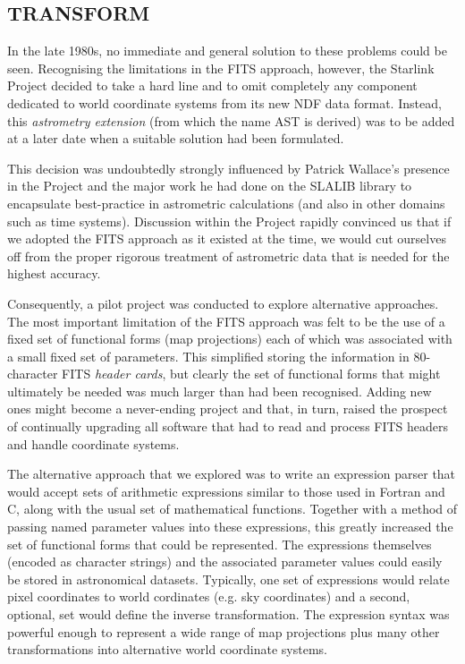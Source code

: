 \documentclass[final,authoryear,5p,times,twocolumn]{elsarticle}
\begin{document}
\subsection{TRANSFORM}

In the late 1980s, no immediate and general solution to these problems
could be seen. Recognising the limitations in the FITS approach,
however, the Starlink Project decided to take a hard line and to omit
completely any component dedicated to world coordinate systems from
its new NDF data format. Instead, this \emph{astrometry extension}
(from which the name AST is derived) was to be added at a later date
when a suitable solution had been formulated.

This decision was undoubtedly strongly influenced by Patrick Wallace's
presence in the Project and the major work he had done on the SLALIB
library \citep[][]{1994ASPC...61..481W} to encapsulate best-practice in
astrometric calculations (and also in other domains such as time
systems). Discussion within the Project rapidly convinced us that if
we adopted the FITS approach as it existed at the time, we would cut
ourselves off from the proper rigorous treatment of astrometric data
that is needed for the highest accuracy.

Consequently, a pilot project was conducted to explore alternative
approaches. The most important limitation of the FITS approach was felt
to be the use of a fixed set of functional forms (map projections) each
of which was associated with a small fixed set of parameters. This
simplified storing the information in 80-character FITS \emph{header cards},
but clearly the set of functional forms that might ultimately be needed
was much larger than had been recognised. Adding new ones might become a
never-ending project and that, in turn, raised the prospect of
continually upgrading all software that had to read and process FITS
headers and handle coordinate systems.

The alternative approach that we explored was to write an expression
parser that would accept sets of arithmetic expressions similar to those
used in Fortran and C, along with the usual set of mathematical
functions. Together with a method of passing named parameter values into
these expressions, this greatly increased the set of functional forms
that could be represented. The expressions themselves (encoded as
character strings) and the associated parameter values could easily be
stored in astronomical datasets. Typically, one set of expressions would
relate pixel coordinates to world cordinates (e.g. sky coordinates) and
a second, optional, set would define the inverse transformation. The
expression syntax was powerful enough to represent a wide range of map
projections plus many other transformations into alternative world
coordinate systems.
\end{document}

